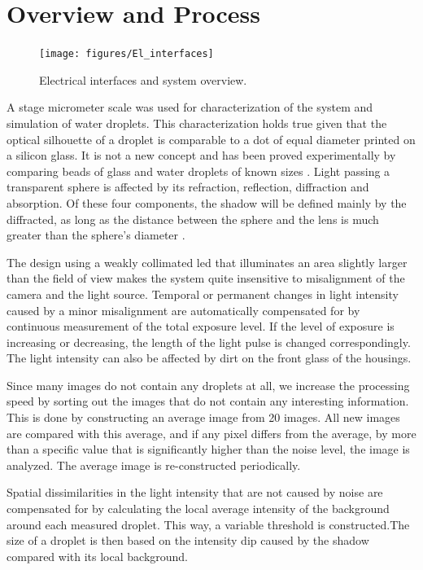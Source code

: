 \section{Overview and Process}
\label{sec:overview}

\begin{figure}[ht]
\centering\texttt{[image: figures/El\_interfaces]}
\caption{Electrical interfaces and system overview.}
\label{fig:el_if}
\end{figure}

A stage micrometer scale was used for characterization of the system and simulation of water droplets. This characterization holds true given that the optical silhouette of a droplet is comparable to a dot of equal diameter printed on a silicon glass. It is not a new concept and has been proved experimentally by comparing beads of glass and water droplets of known sizes \cite{koro1991,koro1998}. Light passing a transparent sphere is affected by its refraction, reflection, diffraction and absorption. Of these four components, the shadow will be defined mainly by the diffracted, as long as the distance between the sphere and the lens is much greater than the sphere's diameter \cite{koro1991,wend2013}.

The design using a weakly collimated \gls{led} that illuminates an area slightly larger than the field of view makes the system quite insensitive to misalignment of the camera and the light source. Temporal or permanent changes in light intensity caused by a minor misalignment are automatically compensated for by continuous measurement of the total exposure level. If the level of exposure is increasing or decreasing, the length of the light pulse is changed correspondingly. The light intensity can also be affected by dirt on the front glass of the housings. 

Since many images do not contain any droplets at all, we increase the processing speed by sorting out the images that do not contain any interesting information. This is done by constructing an average image from 20 images. All new images are compared with this average, and if any pixel differs from the average, by more than a specific value that is significantly higher than the noise level, the image is analyzed. The average image is re-constructed periodically.

Spatial dissimilarities in the light intensity that are not caused by noise are compensated for by calculating the local average intensity of the background around each measured droplet. This way, a variable threshold \cite{gonz2002} is constructed.The size of a droplet is then based on the intensity dip caused by the shadow compared with its local background.

